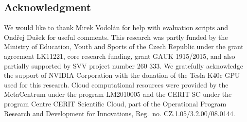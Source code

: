 \documentclass{itatnew}
\def\PB#1{\textcolor{red}{PB: \textit{#1}}}
\begin{document}
\subsection*{Acknowledgment}
We would like to thank Mirek Vodolán for help with evaluation scripts and Ondřej Dušek for useful comments.
This research was partly funded by the Ministry of Education, Youth and Sports of the Czech Republic under the grant agreement LK11221, core research funding, grant GAUK 1915/2015, and also partially supported by SVV project number 260 333. 
We gratefully acknowledge the support of NVIDIA Corporation with the donation of the Tesla K40c GPU used for this research.
Cloud computational resources were provided by the MetaCentrum under the program LM2010005 and the CERIT-SC under the program Centre CERIT Scientific Cloud, part of the Operational Program Research and Development for Innovations, Reg.\ no. CZ.1.05/3.2.00/08.0144.

\newpage


\end{document}

